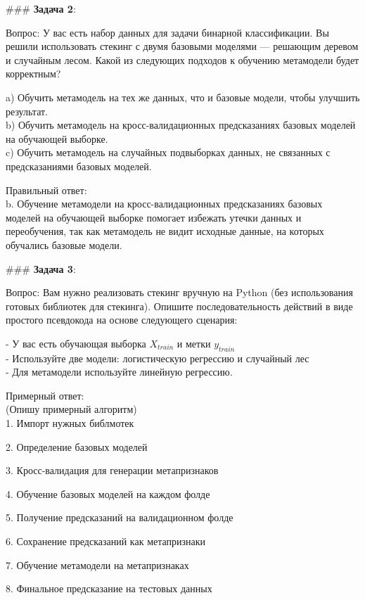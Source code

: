 ### \textbf{Задача 2}: 

Вопрос: У вас есть набор данных для задачи бинарной классификации. Вы решили использовать стекинг с двумя базовыми моделями — решающим деревом и случайным лесом. Какой из следующих подходов к обучению метамодели будет корректным?

a) Обучить метамодель на тех же данных, что и базовые модели, чтобы улучшить результат.  \\
b) Обучить метамодель на кросс-валидационных предсказаниях базовых моделей на обучающей выборке.  \\
c) Обучить метамодель на случайных подвыборках данных, не связанных с предсказаниями базовых моделей.

Правильный ответ:  \\
b. Обучение метамодели на кросс-валидационных предсказаниях базовых моделей на обучающей выборке помогает избежать утечки данных и переобучения, так как метамодель не видит исходные данные, на которых обучались базовые модели.


### \textbf{Задача 3}:

Вопрос: Вам нужно реализовать стекинг вручную на Python (без использования готовых библиотек для стекинга). Опишите последовательность действий в виде простого псевдокода на основе следующего сценария:

- У вас есть обучающая выборка $X_{train}$ и метки $y_{train}$ \\
- Используйте две модели: логистическую регрессию и случайный лес \\
- Для метамодели используйте линейную регрессию.

Примерный ответ:\\
(Опишу примерный алгоритм)\\
1. Импорт нужных библмотек

2. Определение базовых моделей

3. Кросс-валидация для генерации метапризнаков

4. Обучение базовых моделей на каждом фолде
    
5. Получение предсказаний на валидационном фолде
    
6. Сохранение предсказаний как метапризнаки

7. Обучение метамодели на метапризнаках

8. Финальное предсказание на тестовых данных





